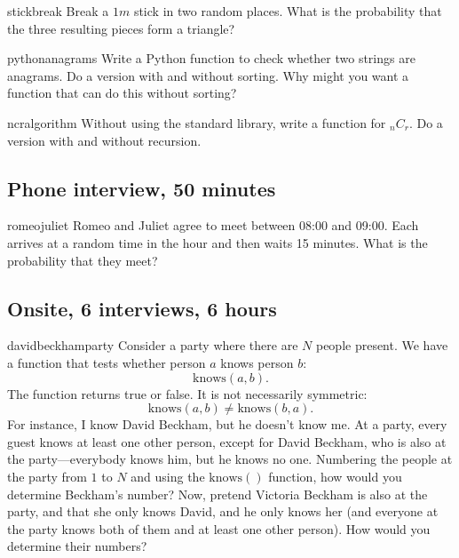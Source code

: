 \documentclass[a4paper]{article}
\begin{document}
\begin{question}{stickbreak}
Break a  $1m$ stick in two random places.
What is the probability that the three resulting pieces form a triangle?
\end{question}


\begin{question}{pythonanagrams}
Write a Python function to check whether two strings are anagrams.
Do a version with and without sorting.
Why might you want a function that can do this without sorting?
\end{question}


\begin{question}{ncralgorithm}
Without using the standard library, write a function for ${}_nC_{r}$.
Do a version with and without recursion.
\end{question}

\clearpage









\clearpage
\subsection{Phone interview,  50 minutes}
\begin{question}{romeojuliet}
Romeo and Juliet agree to meet between 08:00 and 09:00.
Each arrives at a random time in the hour and then waits 15 minutes.
What is the probability that they meet?
\end{question}

\clearpage



\clearpage
\subsection{Onsite, 6 interviews, 6 hours}
\begin{question}{davidbeckhamparty}
Consider a party where there are $N$ people present.
We have a function that tests whether person $a$ knows person $b$:
\[
  \text{knows}(a, b)
  \text{.}
\]
The function returns true or false.
It is not necessarily symmetric:
\[
  \text{knows}(a, b) \neq \text{knows}(b, a)
  \text{.}
\]
For instance, I know David Beckham, but he doesn't know me.
At a party, every guest knows at least one other person, except for David Beckham, who is also at the party---everybody knows him, but he knows no one.
Numbering the people at the party from $1$ to $N$ and using the
$\text{knows}()$
function, how would you determine Beckham's number?
Now, pretend Victoria Beckham is also at the party, and that she only knows David, and he only knows her (and everyone at the party knows both of them and at least one other person).
How would you determine their numbers?
\end{question}
\end{document}
